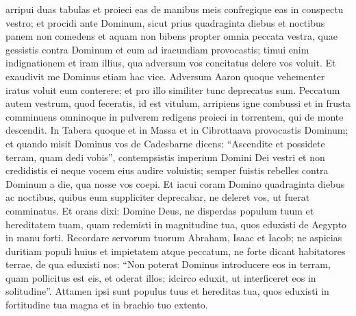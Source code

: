 \begin{biblechapter}
\verse arripui duas tabulas et proieci eas de manibus meis confregique eas in conspectu vestro; 
\verse et procidi ante Dominum, sicut prius quadraginta diebus et noctibus panem non comedens et aquam non bibens propter omnia peccata vestra, quae gessistis contra Dominum et eum ad iracundiam provocastis; 
\verse timui enim indignationem et iram illius, qua adversum vos concitatus delere vos voluit. Et exaudivit me Dominus etiam hac vice. 
\verse Adversum Aaron quoque vehementer iratus voluit eum conterere; et pro illo similiter tunc deprecatus sum. 
\verse Peccatum autem vestrum, quod feceratis, id est vitulum, arripiens igne combussi et in frusta comminuens omninoque in pulverem redigens proieci in torrentem, qui de monte descendit. 
\verse In Tabera quoque et in Massa et in Cibrottaava provocastis Dominum; 
\verse et quando misit Dominus vos de Cadesbarne dicens: “Ascendite et possidete terram, quam dedi vobis”, contempsistis imperium Domini Dei vestri et non credidistis ei neque vocem eius audire voluistis; 
\verse semper fuistis rebelles contra Dominum a die, qua nosse vos coepi. 
\verse Et iacui coram Domino quadraginta diebus ac noctibus, quibus eum suppliciter deprecabar, ne deleret vos, ut fuerat comminatus. 
\verse Et orans dixi: Domine Deus, ne disperdas populum tuum et hereditatem tuam, quam redemisti in magnitudine tua, quos eduxisti de Aegypto in manu forti. 
\verse Recordare servorum tuorum Abraham, Isaac et Iacob; ne aspicias duritiam populi huius et impietatem atque peccatum, 
\verse ne forte dicant habitatores terrae, de qua eduxisti nos: “Non poterat Dominus introducere eos in terram, quam pollicitus est eis, et oderat illos; idcirco eduxit, ut interficeret eos in solitudine”.  
\verse Attamen ipsi sunt populus tuus et hereditas tua, quos eduxisti in fortitudine tua magna et in brachio tuo extento. 
\end{biblechapter}

